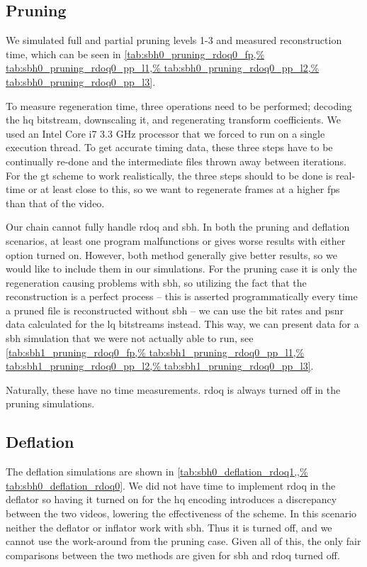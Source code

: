 
\subsection{Pruning}
We simulated full and partial pruning levels 1-3 and measured reconstruction time, which can be seen in \cref{tab:sbh0_pruning_rdoq0_fp,%
tab:sbh0_pruning_rdoq0_pp_l1,%
tab:sbh0_pruning_rdoq0_pp_l2,%
tab:sbh0_pruning_rdoq0_pp_l3}.

To measure regeneration time, three operations need to be performed; decoding the \gls{hq} bitstream, downscaling it, and regenerating transform coefficients. We used an Intel Core i7 3.3 GHz processor that we forced to run on a single execution thread. To get accurate timing data, these three steps have to be continually re-done and the intermediate files thrown away between iterations. For the \gls{gt} scheme to work realistically, the three steps should to be done is real-time or at least close to this, so we want to regenerate frames at a higher \gls{fps} than that of the video.

Our chain cannot fully handle \gls{rdoq} and \gls{sbh}. In both the pruning and deflation scenarios, at least one program malfunctions or gives worse results with either option turned on. However, both method generally give better results, so we would like to include them in our simulations. For the pruning case it is only the regeneration causing problems with \gls{sbh}, so utilizing the fact that the reconstruction is a perfect process -- this is asserted programmatically every time a pruned file is reconstructed without \gls{sbh} -- we can use the bit rates and \gls{psnr} data calculated for the \gls{lq} bitstreams instead. This way, we can present data for a \gls{sbh} simulation that we were not actually able to run, see \cref{tab:sbh1_pruning_rdoq0_fp,%
tab:sbh1_pruning_rdoq0_pp_l1,%
tab:sbh1_pruning_rdoq0_pp_l2,%
tab:sbh1_pruning_rdoq0_pp_l3}.

Naturally, these have no time measurements. \gls{rdoq} is always turned off in the pruning simulations.

\subsection{Deflation}
The deflation simulations are shown in \cref{tab:sbh0_deflation_rdoq1,,%
tab:sbh0_deflation_rdoq0}. We did not have time to implement \gls{rdoq} in the deflator so having it turned on for the \gls{hq} encoding introduces a discrepancy between the two videos, lowering the effectiveness of the scheme. In this scenario neither the deflator or inflator work with \gls{sbh}. Thus it is turned off, and we cannot use the work-around from the pruning case. Given all of this, the only fair comparisons between the two methods are given for \gls{sbh} and \gls{rdoq} turned off.

